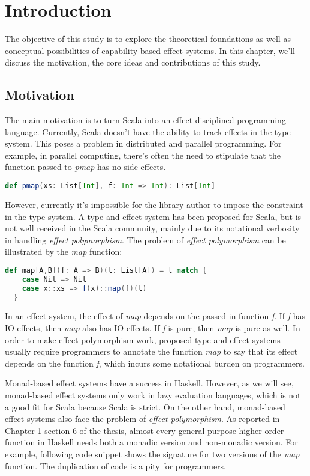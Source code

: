 \section{Introduction}

The objective of this study is to explore the theoretical foundations
as well as conceptual possibilities of capability-based effect
systems. In this chapter, we'll discuss the motivation, the core ideas
and contributions of this study.

\subsection{Motivation}

The main motivation is to turn Scala into an effect-disciplined
programming language. Currently, Scala doesn't have the ability to
track effects in the type system. This poses a problem in distributed
and parallel programming. For example, in parallel computing, there's
often the need to stipulate that the function passed to \emph{pmap}
has no side effects.

\begin{lstlisting}[language=Scala]
def pmap(xs: List[Int], f: Int => Int): List[Int]
\end{lstlisting}

However, currently it's impossible for the library author to impose
the constraint in the type system. A type-and-effect system has been
proposed for Scala\cite{lukas2014effect}, but is not well received in
the Scala community, mainly due to its notational verbosity in
handling \emph{effect polymorphism}. The problem of \emph{effect
  polymorphism} can be illustrated by the \emph{map} function:

\begin{lstlisting}[language=Scala]
  def map[A,B](f: A => B)(l: List[A]) = l match {
    case Nil => Nil
    case x::xs => f(x)::map(f)(l)
  }
\end{lstlisting}

In an effect system, the effect of \emph{map} depends on the passed in
function \emph{f}. If \emph{f} has IO effects, then \emph{map} also
has IO effects. If \emph{f} is pure, then \emph{map} is pure as
well. In order to make effect polymorphism work, proposed
type-and-effect systems usually require programmers to annotate the
function \emph{map} to say that its effect depends on the function
\emph{f}, which incurs some notational burden on programmers.

Monad-based effect systems have a success in Haskell. However, as we
will see, monad-based effect systems only work in lazy evaluation
languages, which is not a good fit for Scala because Scala is
strict. On the other hand, monad-based effect systems also face the
problem of \emph{effect polymorphism}. As reported in Chapter 1
section 6 of the thesis\cite{lippmeier2009type}, almost every general
purpose higher-order function in Haskell needs both a monadic version
and non-monadic version. For example, following code snippet shows the
signature for two versions of the \emph{map} function. The duplication
of code is a pity for programmers.

